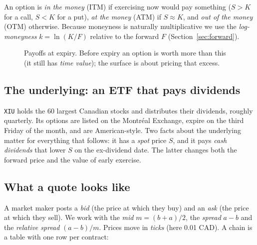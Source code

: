 \documentclass[11pt]{article}
\begin{document}
An option is \emph{in the money} (ITM) if exercising now would pay something
($S>K$ for a call, $S<K$ for a put), \emph{at the money} (ATM) if $S\approx K$,
and \emph{out of the money} (OTM) otherwise. Because moneyness is naturally
multiplicative we use the \emph{log-moneyness} $k=\ln(K/F)$ relative to the
forward $F$ (Section~\ref{sec:forward}).

\begin{figure}[ht]
\centering
{}
\caption{Payoffs at expiry. Before expiry an option is worth more than this
(it still has \emph{time value}); the surface is about pricing that excess.}
\end{figure}

\subsection{The underlying: an ETF that pays dividends}

\texttt{XIU} holds the 60 largest Canadian stocks and distributes their
dividends, roughly quarterly. Its options are listed on the Montr\'eal Exchange,
expire on the third Friday of the month, and are American-style. Two facts about
the underlying matter for everything that follows: it has a
\emph{spot} price $S$, and it pays \emph{cash dividends} that lower $S$ on the
ex-dividend date. The latter changes both the forward price and the value of
early exercise.

\subsection{What a quote looks like}\label{sec:quotes}

A market maker posts a \emph{bid} (the price at which they buy) and an
\emph{ask} (the price at which they sell). We work with the \emph{mid}
$m=(b+a)/2$, the \emph{spread} $a-b$ and the \emph{relative spread} $(a-b)/m$.
Prices move in \emph{ticks} (here 0.01 CAD). A chain is a table with one row
per contract:
\end{document}
